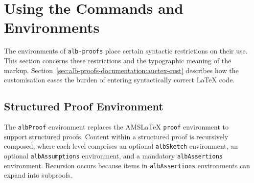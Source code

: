 \documentclass[11pt,a4paper,oneside,titlepage]{alb-corp}
\begin{document}

\section{Using the Commands and Environments}
\label{sec:alb-proofs-documentation:using-comm-envir}

The environments of \texttt{alb-proofs} place certain syntactic
restrictions on their use.  This section concerns these restrictions and
the typographic meaning of the markup.
Section~\ref{sec:alb-proofs-documentation:auctex-cust} describes how the
\AUCTeX{} customisation eases the burden of entering syntactically
correct \LaTeX{} code.



\subsection{Structured Proof Environment}
\label{sec:alb-proofs-documentation:struct-proof-envir}

The \texttt{albProof} environment replaces the AMS\LaTeX{}
\texttt{proof} environment to support structured proofs.  Content within
a structured proof is recursively composed, where each level comprises
an optional \texttt{albSketch} environment, an optional
\texttt{albAssumptions} environment, and a mandatory
\texttt{albAssertions} environment.  Recursion occurs because items in
\texttt{albAssertions} environments can expand into subproofs.
\end{document}
